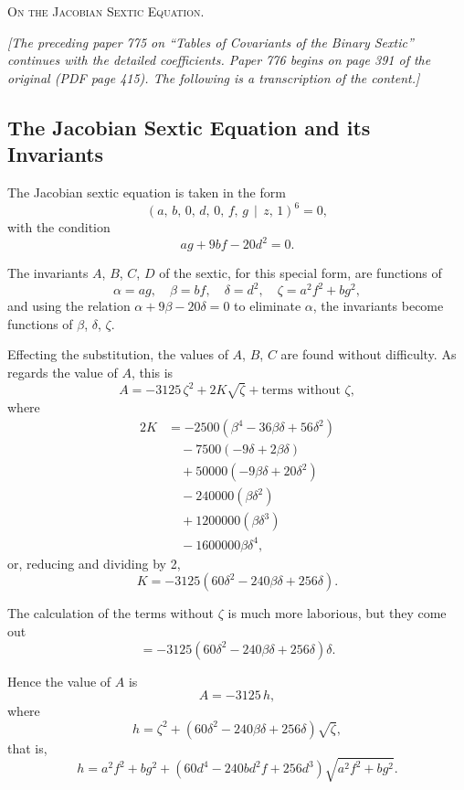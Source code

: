 \documentclass[11pt,a4paper]{article}
\theoremstyle{cayley}
\begin{document}
\begin{center}
\Large\scshape On the Jacobian Sextic Equation.
\end{center}

\textit{[The preceding paper 775 on ``Tables of Covariants of the Binary Sextic'' continues with the detailed coefficients. Paper 776 begins on page 391 of the original (PDF page 415). The following is a transcription of the content.]}

\subsection*{The Jacobian Sextic Equation and its Invariants}

The Jacobian sextic equation is taken in the form
\[
(a,\, b,\, 0,\, d,\, 0,\, f,\, g \,\!\!\mid\!\!\, z,\, 1)^{6} = 0,
\]
with the condition
\[
ag + 9bf - 20d^{2} = 0.
\]

The invariants $A$, $B$, $C$, $D$ of the sextic, for this special form, are functions of
\[
\alpha = ag,\quad \beta = bf,\quad \delta = d^{2},\quad \zeta = a^{2}f^{2} + bg^{2},
\]
and using the relation $\alpha + 9\beta - 20\delta = 0$ to eliminate $\alpha$, the invariants become functions of $\beta$, $\delta$, $\zeta$.

Effecting the substitution, the values of $A$, $B$, $C$ are found without difficulty. As regards the value of $A$, this is
\[
A = -3125\,\zeta^{2} + 2K\sqrt{\zeta} + \text{terms without }\zeta,
\]
where
\begin{align*}
2K &= -2500(\beta^{4} - 36\beta\delta + 56\delta^{2}) \\
&\quad -7500(-9\delta + 2\beta\delta) \\
&\quad +50000(-9\beta\delta + 20\delta^{2}) \\
&\quad -240000(\beta\delta^{2}) \\
&\quad +1200000(\beta\delta^{3}) \\
&\quad -1600000\beta\delta^{4},
\end{align*}
or, reducing and dividing by 2,
\[
K = -3125(60\delta^{2} - 240\beta\delta + 256\delta).
\]

The calculation of the terms without $\zeta$ is much more laborious, but they come out
\[
= -3125(60\delta^{2} - 240\beta\delta + 256\delta)\delta.
\]

Hence the value of $A$ is
\[
A = -3125\,h,
\]
where
\[
h = \zeta^{2} + (60\delta^{2} - 240\beta\delta + 256\delta)\sqrt{\zeta},
\]
that is,
\[
h = a^{2}f^{2} + bg^{2} + (60d^{4} - 240bd^{2}f + 256d^{3})\sqrt{a^{2}f^{2} + bg^{2}}.
\]
\end{document}
